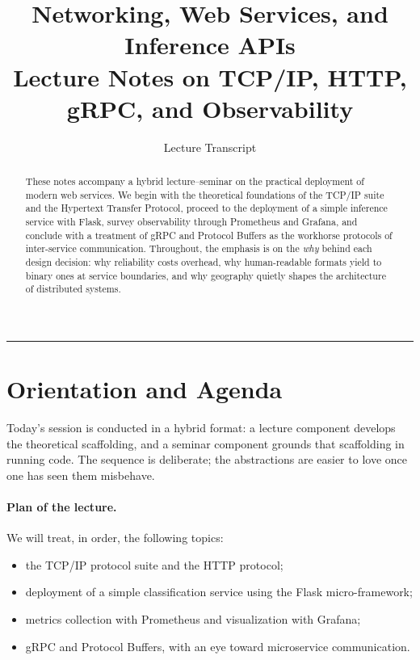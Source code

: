\documentclass[11pt,a4paper]{article}
\title{\textbf{Networking, Web Services, and Inference APIs} \\[0.4em]
       \large Lecture Notes on TCP/IP, HTTP, gRPC, and Observability}
\author{Lecture Transcript}
\date{}
\theoremstyle{definition}
\theoremstyle{remark}
\begin{document}
\maketitle


\begin{abstract}
\noindent
These notes accompany a hybrid lecture--seminar on the practical deployment of modern web services. We begin with the theoretical foundations of the TCP/IP suite and the Hypertext Transfer Protocol, proceed to the deployment of a simple inference service with Flask, survey observability through Prometheus and Grafana, and conclude with a treatment of gRPC and Protocol Buffers as the workhorse protocols of inter-service communication. Throughout, the emphasis is on the \emph{why} behind each design decision: why reliability costs overhead, why human-readable formats yield to binary ones at service boundaries, and why geography quietly shapes the architecture of distributed systems.
\end{abstract}

\tableofcontents
\vspace{1em}\hrule\vspace{1em}

\section{Orientation and Agenda}

Today's session is conducted in a hybrid format: a lecture component develops the theoretical scaffolding, and a seminar component grounds that scaffolding in running code. The sequence is deliberate; the abstractions are easier to love once one has seen them misbehave.

\paragraph{Plan of the lecture.}
We will treat, in order, the following topics:
\begin{itemize}
    \item the TCP/IP protocol suite and the HTTP protocol;
    \item deployment of a simple classification service using the Flask micro-framework;
    \item metrics collection with Prometheus and visualization with Grafana;
    \item gRPC and Protocol Buffers, with an eye toward microservice communication.
\end{itemize}
\end{document}
